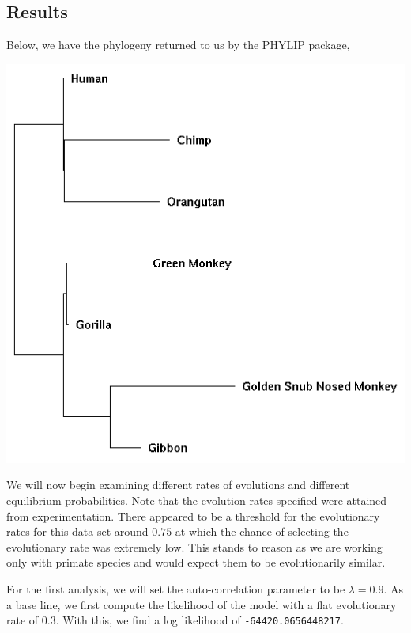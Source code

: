 \documentclass[12pt]{article}
\begin{document}
\subsection*{Results}
    Below, we have the phylogeny returned to us by the PHYLIP package,
    \begin{center}
        \includegraphics[scale=0.5]{../figs/phylo.png}
    \end{center}
    We will now begin examining different rates of evolutions and different equilibrium probabilities.
    Note that the evolution rates specified were attained from experimentation.
    There appeared to be a threshold for the evolutionary rates for this data set around $0.75$ at which the chance of selecting the evolutionary rate was extremely low.
    This stands to reason as we are working only with primate species and would expect them to be evolutionarily similar.

    For the first analysis, we will set the auto-correlation parameter to be $\lambda=0.9$.
    As a base line, we first compute the likelihood of the model with a flat evolutionary rate of $0.3$.
    With this, we find a log likelihood of \texttt{-64420.0656448217}.
\end{document}
